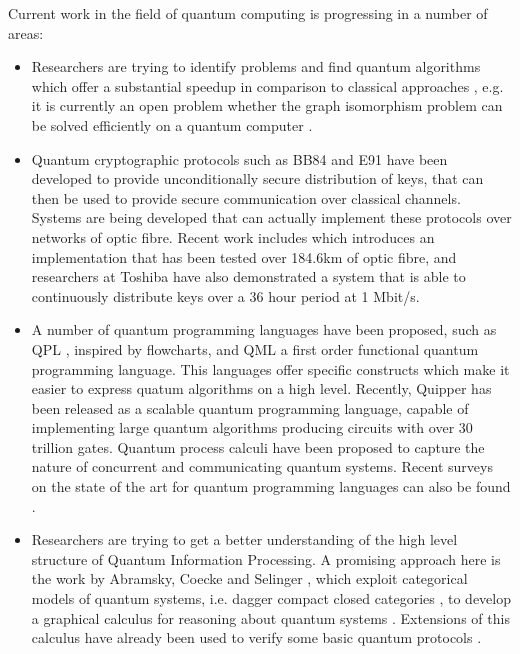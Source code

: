 \documentclass[a4paper]{article}
\begin{document}
Current work in the field of quantum computing is progressing in a number 
of areas:
\begin{itemize}
\item
Researchers are trying to identify problems and find quantum algorithms which
offer a substantial speedup in comparison to classical approaches
, e.g. it is currently an open problem whether the graph
isomorphism problem can be solved efficiently on a quantum computer
.  
\item
Quantum cryptographic protocols such as BB84  and E91
 have been developed to provide unconditionally secure
distribution of keys, that can then be used to provide secure
communication over classical channels. Systems are being developed
that can actually implement these protocols over networks of optic
fibre. Recent work includes  which introduces an
implementation that has been tested over 184.6km of optic fibre, 
and researchers at Toshiba  have also
demonstrated a system that is able to continuously distribute keys
over a 36 hour period at 1 Mbit/s. 
\item A number of quantum programming languages have been proposed,
  such as QPL , inspired by flowcharts, and QML
   a first order functional quantum
  programming language. This languages offer specific constructs which
  make it easier to express quatum algorithms on a high
  level. Recently, Quipper  has
  been released as a scalable quantum programming language, capable of
  implementing large quantum algorithms producing circuits with over
  30 trillion gates. Quantum process calculi  have been
  proposed to capture the nature of concurrent and communicating
  quantum systems.  Recent surveys on the state of the art for quantum
  programming languages can also be found
  .
\item
Researchers are trying 
to get a better understanding of the
high level structure of Quantum Information Processing. A promising approach here
is the work by Abramsky, Coecke and Selinger , 
which exploit
categorical models of quantum systems, i.e. dagger compact closed
categories , to develop a graphical calculus for reasoning about
quantum systems . Extensions of this calculus have already
been used to verify some basic quantum protocols .
\end{itemize}
\end{document}
